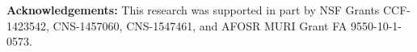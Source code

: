 \textbf{Acknowledgements:}
This research was supported in part by NSF Grants CCF-1423542, CNS-1457060, CNS-1547461, and AFOSR MURI Grant FA 9550-10-1-0573. 
